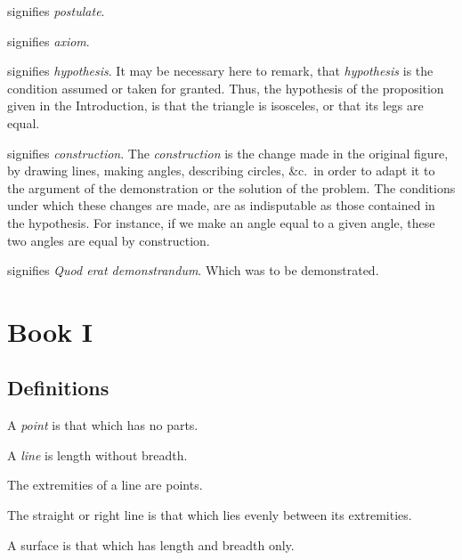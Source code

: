 \documentclass[booklanguage=english]{byrnebook}
\begin{document}
\symb{\inpoststr}
 signifies \emph{postulate}.

\symb{\inaxstr}
 signifies \emph{axiom}.

 signifies \emph{hypothesis}. It may be necessary here to remark, that \emph{hypothesis} is the condition assumed or taken for granted. Thus, the hypothesis of the proposition given in the Introduction, is that the triangle is isosceles, or that its legs are equal.

\symb{\conststr}
 signifies \emph{construction}. The \emph{construction} is the change made in the original figure, by drawing lines, making angles, describing circles, \&c.\ in order to adapt it to the argument of the demonstration or the solution of the problem. The conditions under which these changes are made, are as indisputable as those contained in the hypothesis. For instance, if we make an angle equal to a given angle, these two angles are equal by construction.

\symb{\qedstr}
signifies \emph{Quod erat demonstrandum}. Which was to be demonstrated.

\part{Book I}

\chapter*{Definitions}

\startdefinition{}
\begin{center}
A \emph{point} is that which has no parts.
\end{center}

\startdefinition{}
\begin{center}
A \emph{line} is length without breadth.
\end{center}

\startdefinition{}
\begin{center}
The extremities of a line are points.
\end{center}

\startdefinition{}
\begin{center}
The straight or right line is that which lies evenly between its extremities.
\end{center}

\startdefinition{}
\begin{center}
A surface is that which has length and breadth only.
\end{center}
\end{document}

